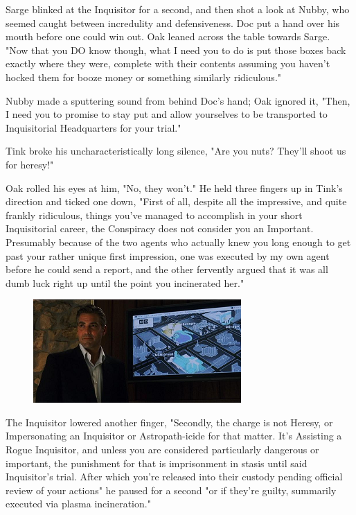 Sarge blinked at the Inquisitor for a second, and then shot a look at Nubby, who seemed caught between incredulity and defensiveness. 
Doc put a hand over his mouth before one could win out. 
Oak leaned across the table towards Sarge. 
"Now that you DO know though, what I need you to do is put those boxes back exactly where they were, complete with their contents assuming you haven't hocked them for booze money or something similarly ridiculous."

Nubby made a sputtering sound from behind Doc's hand; 
Oak ignored it, "Then, I need you to promise to stay put and allow yourselves to be transported to Inquisitorial Headquarters for your trial."

Tink broke his uncharacteristically long silence, "Are you nuts? 
They'll shoot us for heresy!"

Oak rolled his eyes at him, "No, they won't." He held three fingers up in Tink's direction and ticked one down, "First of all, despite all the impressive, and quite frankly ridiculous, things you've managed to accomplish in your short Inquisitorial career, the Conspiracy does not consider you an Important. 
Presumably because of the two agents who actually knew you long enough to get past your rather unique first impression, one was executed by my own agent before he could send a report, and the other fervently argued that it was all dumb luck right up until the point you incinerated her."


\begin{figure}
	\begin{center}
		\includegraphics[width=\figwidth]{pics/20/22.png}
	\end{center}
\end{figure}

The Inquisitor lowered another finger, "Secondly, the charge is not Heresy, or Impersonating an Inquisitor or Astropath-icide for that matter. 
It's Assisting a Rogue Inquisitor, and unless you are considered particularly dangerous or important, the punishment for that is imprisonment in stasis until said Inquisitor's trial. 
After which you're released into their custody pending official review of your actions" he paused for a second "or if they're guilty, summarily executed via plasma incineration."

